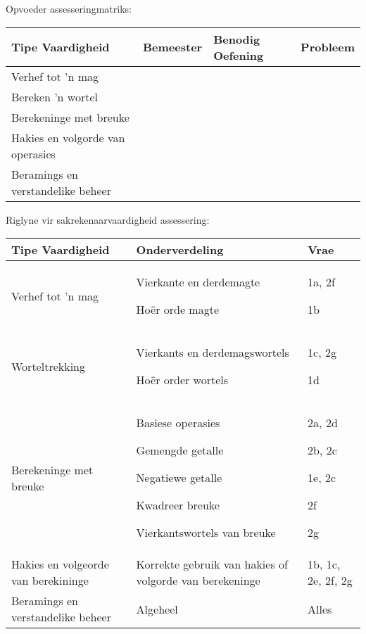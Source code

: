 Opvoeder assesseringmatriks:
\begin{table}[H]
 \begin{center}
  \begin{tabular}{|p{4.5cm}|p{1.5cm}|p{3cm}|p{1.5cm}|} \hline

\textbf{Tipe Vaardigheid} & \textbf{Bemeester} & \textbf{Benodig Oefening} & \textbf{Probleem}   \\ \hline
Verhef tot 'n mag &&&\\ \hline
Bereken 'n wortel &&&\\ \hline
Berekeninge met breuke &&&\\ \hline
Hakies en volgorde van operasies &&&\\ \hline
Beramings en verstandelike beheer &&&\\ \hline
   
  \end{tabular}

 \end{center}

\end{table}
Riglyne vir sakrekenaarvaardigheid assessering:
\begin{table}[H]
 \begin{center}
  \begin{tabular}{|p{5cm}|p{4cm}|p{3cm}|} \hline

\textbf{Tipe Vaardigheid} & \textbf{Onderverdeling} & \textbf{Vrae}   \\ \hline
Verhef tot 'n mag & Vierkante en derdemagte\par Ho\"{e}r orde magte&1a, 2f \par1b \\ \hline
Worteltrekking& Vierkants en derdemagswortels \par Ho\"{e}r order wortels & 1c, 2g \par 1d\\ \hline
Berekeninge met breuke & Basiese operasies \par Gemengde getalle \par Negatiewe getalle \par Kwadreer breuke \par Vierkantswortels van breuke &2a,  2d\par
2b, 2c\par
1e, 2c\par
2f\par
2g
\\ \hline
Hakies en volgeorde van berekininge&Korrekte gebruik van hakies of volgorde van berekeninge&1b, 1c, 2e, 2f, 2g\\ \hline
Beramings en verstandelike beheer &Algeheel&Alles\\ \hline
   
  \end{tabular}

 \end{center}

\end{table}

